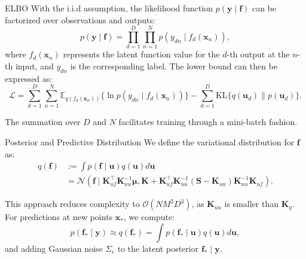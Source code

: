 \documentclass[10pt, xcolor=table]{beamer}
\begin{document}
\begin{frame}{ELBO}
	With the i.i.d assumption, the likelihood function $p(\mathbf{y} \mid \mathbf{f})$ can be factorized over observations and outputs:
	\begin{equation}
	p(\mathbf{y} \mid \mathbf{f}) = \prod_{d=1}^D\prod_{n=1}^N p(y_{dn} \mid f_{d}(\mathbf{x}_n)),
	\end{equation}
	where $f_{d}(\mathbf{x}_n)$ represents the latent function value for the $d$-th output at the $n$-th input, and $y_{dn}$ is the corresponding label. The lower bound can then be expressed as:
	\begin{equation}\label{eq:sogp_elbo}
	\mathcal{L} = \sum_{d=1}^D\sum_{n=1}^N \mathbb{E}_{q(f_{d}(\mathbf{x}_n))}\{\ln p(y_{dn} \mid f_{d}(\mathbf{x}_n))\} - \sum_{d=1}^D \text{KL}\{q(\mathbf{u}_d)\parallel p(\mathbf{u}_d)\}.
	\end{equation}
	
	The summation over $D$ and $N$ facilitates training through a mini-batch fashion.
\end{frame}

\begin{frame}{Posterior and Predictive Distribution}
	We define the variational distribution for $\mathbf{f}$ as:
	\begin{align}
	q(\mathbf{f}) &:= \int p(\mathbf{f} \mid \mathbf{u}) q(\mathbf{u}) d\mathbf{u} \nonumber \\
	&= \mathcal{N}\left(\mathbf{f} \mid \mathbf{K}_{uf}^\top \mathbf{K}_{uu}^{-1} \boldsymbol{\mu}, \mathbf{K} + \mathbf{K}_{uf}^\top \mathbf{K}_{uu}^{-1}(\mathbf{S} - \mathbf{K}_{uu})\mathbf{K}_{uu}^{-1}\mathbf{K}_{uf} \right).
	\end{align}
	
	This approach reduces complexity to $\mathcal{O}(NM^2D^3)$, as $\mathbf{K}_{uu}$ is smaller than $\mathbf{K}_{y}$. For predictions at new points $\mathbf{x}_*$, we compute:
	\begin{equation}
	p(\mathbf{f}_* \mid \mathbf{y}) \approx q(\mathbf{f}_*) = \int p(\mathbf{f}_* \mid \mathbf{u}) q(\mathbf{u}) d \mathbf{u},
	\end{equation}
	and adding Gaussian noise $\Sigma_\epsilon$ to the latent posterior $\mathbf{f}_* \mid \mathbf{y}$.
\end{frame}
\end{document}

